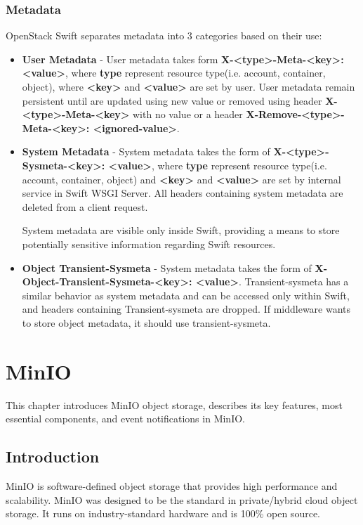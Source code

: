     \subsection{Metadata}
    OpenStack Swift separates metadata into 3 categories based on their use:
    \begin{itemize}
        \item \textbf{User Metadata} - User metadata takes form \textbf{X-<type>-Meta-<key>: <value>}, where \textbf{type} represent resource type(i.e. account, container, object), where \textbf{<key>} and \textbf{<value>} are set by user. User metadata remain persistent until are updated using new value or removed using header  \textbf{X-<type>-Meta-<key>} with no value or a header \textbf{X-Remove-<type>-Meta-<key>: <ignored-value>}.
        \item \textbf{System Metadata} - System metadata takes the form of \textbf{X-<type>-Sysmeta-<key>: <value>}, where \textbf{type} represent resource type(i.e. account, container, object) and \textbf{<key>} and \textbf{<value>} are set by internal service in Swift WSGI Server.
        All headers containing system metadata are deleted from a client request.

        System metadata are visible only inside Swift, providing a means to store potentially sensitive information regarding Swift resources.
        \item \textbf{Object Transient-Sysmeta} - System metadata takes the form of \textbf{X-Object-Transient-Sysmeta-<key>: <value>}. Transient-sysmeta has a similar behavior as system metadata and can be accessed only within Swift, and headers containing Transient-sysmeta are dropped. If middleware wants to store object metadata, it should use transient-sysmeta\cite{swiftMiddleware}.
    \end{itemize}

\chapter{MinIO}
This chapter introduces MinIO object storage, describes its key features, most essential components, and event notifications in MinIO.

\section{Introduction}
    MinIO is software-defined object storage that provides high performance and scalability. MinIO was designed to be the standard in private/hybrid cloud object storage.
    It runs on industry-standard hardware and is 100\% open source\cite{minioObjectStorage}.


